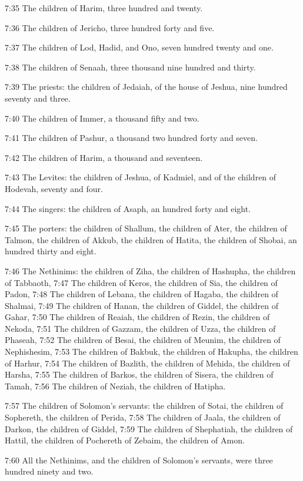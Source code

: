 7:35 The children of Harim, three hundred and twenty.

7:36 The children of Jericho, three hundred forty and five.

7:37 The children of Lod, Hadid, and Ono, seven hundred twenty and one.

7:38 The children of Senaah, three thousand nine hundred and thirty.

7:39 The priests: the children of Jedaiah, of the house of Jeshua, nine hundred seventy and three.

7:40 The children of Immer, a thousand fifty and two.

7:41 The children of Pashur, a thousand two hundred forty and seven.

7:42 The children of Harim, a thousand and seventeen.

7:43 The Levites: the children of Jeshua, of Kadmiel, and of the children of Hodevah, seventy and four.

7:44 The singers: the children of Asaph, an hundred forty and eight.

7:45 The porters: the children of Shallum, the children of Ater, the children of Talmon, the children of Akkub, the children of Hatita, the children of Shobai, an hundred thirty and eight.

7:46 The Nethinims: the children of Ziha, the children of Hashupha, the children of Tabbaoth, 7:47 The children of Keros, the children of Sia, the children of Padon, 7:48 The children of Lebana, the children of Hagaba, the children of Shalmai, 7:49 The children of Hanan, the children of Giddel, the children of Gahar, 7:50 The children of Reaiah, the children of Rezin, the children of Nekoda, 7:51 The children of Gazzam, the children of Uzza, the children of Phaseah, 7:52 The children of Besai, the children of Meunim, the children of Nephishesim, 7:53 The children of Bakbuk, the children of Hakupha, the children of Harhur, 7:54 The children of Bazlith, the children of Mehida, the children of Harsha, 7:55 The children of Barkos, the children of Sisera, the children of Tamah, 7:56 The children of Neziah, the children of Hatipha.

7:57 The children of Solomon's servants: the children of Sotai, the children of Sophereth, the children of Perida, 7:58 The children of Jaala, the children of Darkon, the children of Giddel, 7:59 The children of Shephatiah, the children of Hattil, the children of Pochereth of Zebaim, the children of Amon.

7:60 All the Nethinims, and the children of Solomon's servants, were three hundred ninety and two.

